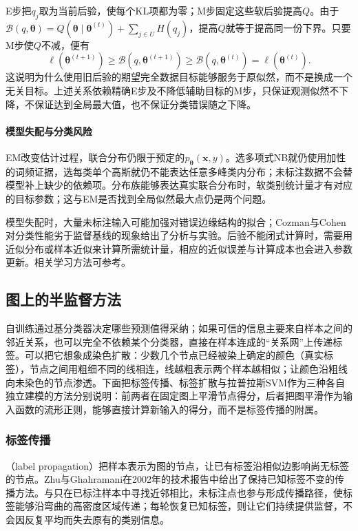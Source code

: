 E步把$q_j$取为当前后验，使每个KL项都为零；M步固定这些软后验提高$Q$。由于$\mathcal B(q,\bm\theta)=Q(\bm\theta\mid\bm\theta^{(t)})+\sum_{j\in U}H(q_j)$，提高$Q$就等于提高同一份下界。只要M步使$Q$不减，便有
\[
  \ell(\bm\theta^{(t+1)})
    \geq\mathcal B(q,\bm\theta^{(t+1)})
    \geq\mathcal B(q,\bm\theta^{(t)})
    =\ell(\bm\theta^{(t)}).
\]
这说明为什么使用旧后验的期望完全数据目标能够服务于原似然，而不是换成一个无关目标。上述关系依赖精确E步及不降低辅助目标的M步，只保证观测似然不下降，不保证达到全局最大值，也不保证分类错误随之下降。

\paragraph{模型失配与分类风险}
EM改变估计过程，联合分布仍限于预定的$p_{\bm\theta}(\bm x,y)$。选多项式NB就仍使用加性的词频证据，选每类单个高斯就仍不能表达任意多峰类内分布；未标注数据不会替模型补上缺少的依赖项。分布族能够表达真实联合分布时，软类别统计量才有对应的目标参数；这与EM是否找到全局似然最大点仍是两个问题。

模型失配时，大量未标注输入可能加强对错误边缘结构的拟合；Cozman与Cohen对分类性能劣于监督基线的现象给出了分析与实验。后验不能闭式计算时，需要用近似分布或样本近似来计算所需统计量，相应的近似误差与计算成本也会进入参数更新。相关学习方法可参考。

\subsection{图上的半监督方法}
\label{sec:classification-graph-methods}

自训练通过基分类器决定哪些预测值得采纳；如果可信的信息主要来自样本之间的邻近关系，也可以完全不依赖某个分类器，直接在样本连成的“关系网”上传递标签。可以把它想象成染色扩散：少数几个节点已经被染上确定的颜色（真实标签），节点之间用粗细不同的线相连，线越粗表示两个样本越相似；让颜色沿粗线向未染色的节点渗透。下面把标签传播、标签扩散与拉普拉斯SVM作为三种各自独立建模的方法分别说明：前两者在固定图上平滑节点得分，后者把图平滑作为输入函数的流形正则，能够直接计算新输入的得分，而不是标签传播的附属。

\subsubsection{标签传播}
\label{sec:classification-label-propagation}

（label propagation）把样本表示为图的节点，让已有标签沿相似边影响尚无标签的节点。Zhu与Ghahramani在2002年的技术报告中给出了保持已知标签不变的传播方法。与只在已标注样本中寻找近邻相比，未标注点也参与形成传播路径，使标签能够沿弯曲的高密度区域传递；每轮恢复已知标签，则让它们持续提供监督，不会因反复平均而失去原有的类别信息。

